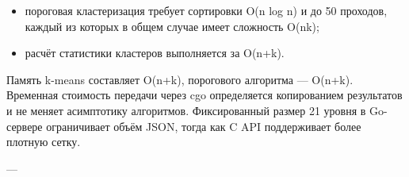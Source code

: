 \begin{itemize}
\item пороговая кластеризация требует сортировки O(n log n) и до 50 проходов, каждый из которых в общем случае имеет сложность O(nk);
\end{itemize}

\begin{itemize}
\item расчёт статистики кластеров выполняется за O(n+k).
\end{itemize}

Память k-means составляет O(n+k), порогового алгоритма — O(n+k). Временная стоимость передачи через cgo определяется копированием результатов и не меняет асимптотику алгоритмов. Фиксированный размер 21 уровня в Go-сервере ограничивает объём JSON, тогда как C API поддерживает более плотную сетку.

---
